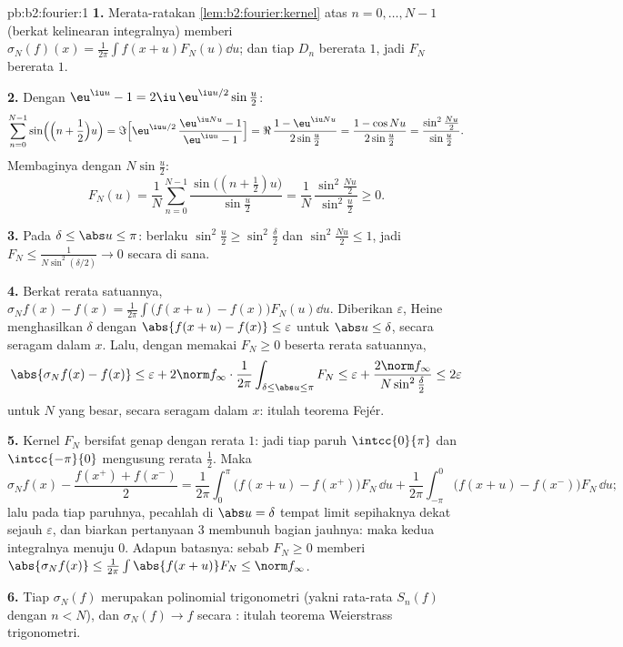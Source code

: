 \begin{solution}{pb:b2:fourier:1}
\textbf{1.} Merata-ratakan \cref{lem:b2:fourier:kernel} atas $n = 0,
\dots, N-1$ (berkat kelinearan integralnya) memberi $\sigma_N(f)(x) =
\frac{1}{2\pi}\int f(x+u)F_N(u)\dd u$; dan tiap $D_n$ bererata
$1$, jadi $F_N$ bererata $1$.

\textbf{2.} Dengan $\eu^{\iu u} - 1 = 2\iu\,\eu^{\iu
u/2}\sin\frac u2$:
\[
\sum_{n=0}^{N-1}\sin\Bigl(\Bigl(n + \frac12\Bigr)u\Bigr)
= \Im\Bigl[\eu^{\iu u/2}\,\frac{\eu^{\iu Nu} - 1}{\eu^{\iu u}
- 1}\Bigr]
= \Re\,\frac{1 - \eu^{\iu Nu}}{2\sin\frac u2}
= \frac{1 - \cos Nu}{2\sin\frac u2}
= \frac{\sin^2\frac{Nu}2}{\sin\frac u2} .
\]
Membaginya dengan $N\sin\frac u2$:
\[
F_N(u) = \frac1N\sum_{n=0}^{N-1}
\frac{\sin\bigl((n+\frac12)u\bigr)}{\sin\frac u2}
= \frac{1}{N}\,
\frac{\sin^2\frac{Nu}{2}}{\sin^2\frac u2} \geq 0 .
\]

\textbf{3.} Pada $\delta \leq \abs u \leq \pi$: berlaku $\sin^2\frac u2
\geq \sin^2\frac\delta2$ dan $\sin^2\frac{Nu}2 \leq 1$, jadi $F_N
\leq \frac{1}{N\sin^2(\delta/2)} \to 0$ secara  di sana.

\textbf{4.} Berkat rerata satuannya, $\sigma_Nf(x) - f(x) =
\frac{1}{2\pi}\int\bigl(f(x+u) - f(x)\bigr)F_N(u)\dd u$. Diberikan
$\varepsilon$, Heine menghasilkan $\delta$ dengan $\abs{f(x+u) - f(x)}
\leq \varepsilon$ untuk $\abs u \leq \delta$, secara seragam dalam $x$.
Lalu, dengan memakai $F_N \geq 0$ beserta rerata satuannya,
\[
\abs{\sigma_Nf(x) - f(x)}
\leq \varepsilon +
2\norm f_\infty\cdot\frac{1}{2\pi}
\int_{\delta\leq\abs u\leq\pi}F_N
\leq \varepsilon + \frac{2\norm
f_\infty}{N\sin^2\frac\delta2}
\leq 2\varepsilon
\]
untuk $N$ yang besar, secara seragam dalam $x$: itulah teorema Fejér.

\textbf{5.} Kernel $F_N$ bersifat genap dengan rerata $1$: jadi tiap paruh
$\intcc{0}{\pi}$ dan $\intcc{-\pi}{0}$ mengusung rerata $\frac12$.
Maka
\[
\sigma_Nf(x) - \frac{f(x^+)+f(x^-)}{2}
= \frac{1}{2\pi}\int_0^\pi\bigl(f(x+u) -
f(x^+)\bigr)F_N\,\dd u
+ \frac{1}{2\pi}\int_{-\pi}^0\bigl(f(x+u) -
f(x^-)\bigr)F_N\,\dd u ;
\]
lalu pada tiap paruhnya, pecahlah di $\abs u = \delta$ tempat limit
sepihaknya dekat sejauh $\varepsilon$, dan biarkan pertanyaan 3 membunuh bagian
jauhnya: maka kedua integralnya menuju $0$. Adapun batasnya: sebab $F_N \geq 0$
memberi $\abs{\sigma_Nf(x)} \leq
\frac{1}{2\pi}\int\abs{f(x+u)}F_N \leq \norm f_\infty$.

\textbf{6.} Tiap $\sigma_N(f)$ merupakan polinomial trigonometri
(yakni rata-rata $S_n(f)$ dengan $n < N$), dan $\sigma_N(f) \to f$
secara : itulah teorema Weierstrass trigonometri.


\end{solution}
